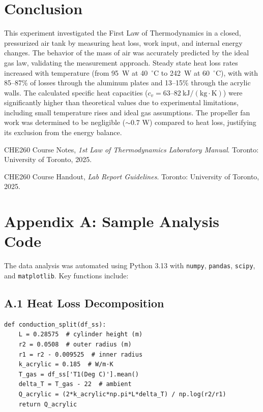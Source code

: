 \documentclass[12pt]{article}
\begin{document}
\section*{Conclusion}
This experiment investigated the First Law of Thermodynamics in a closed, pressurized air tank by measuring heat loss, work input, and internal energy changes.
The behavior of the mass of air was accurately predicted by the ideal gas law, validating the measurement approach.
Steady state heat loss rates increased with temperature (from 95~W at 40~$^{\circ}$C to 242~W at 60~$^{\circ}$C), with with 85--87\% of losses through the aluminum plates and 13--15\% through the acrylic walls.
The calculated specific heat capacities ($c_v = 63$--$82~\mathrm{kJ/(kg \cdot K)}$) were significantly higher than theoretical values due to experimental limitations, including small temperature rises and ideal gas assumptions.
The propeller fan work was determined to be negligible ($\sim 0.7$ W) compared to heat loss, justifying its exclusion from the energy balance.


\begin{thebibliography}{9}
CHE260 Course Notes, \textit{1st Law of Thermodynamics Laboratory Manual}. Toronto: University of Toronto, 2025.

CHE260 Course Handout, \textit{Lab Report Guidelines}. Toronto: University of Toronto, 2025.
\end{thebibliography}

\newpage

\appendix

\section*{Appendix A: Sample Analysis Code}

The data analysis was automated using Python 3.13 with \texttt{numpy}, \texttt{pandas}, \texttt{scipy}, and \texttt{matplotlib}. Key functions include:

\subsection*{A.1 Heat Loss Decomposition}

\begin{verbatim}
def conduction_split(df_ss):
    L = 0.28575  # cylinder height (m)
    r2 = 0.0508  # outer radius (m)
    r1 = r2 - 0.009525  # inner radius
    k_acrylic = 0.185  # W/m·K
    T_gas = df_ss['T1(Deg C)'].mean()
    delta_T = T_gas - 22  # ambient
    Q_acrylic = (2*k_acrylic*np.pi*L*delta_T) / np.log(r2/r1)
    return Q_acrylic
\end{verbatim}
\end{document}
